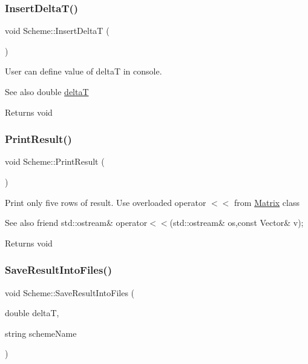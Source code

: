\subsubsection{\texorpdfstring{Insert\+Delta\+T()}{InsertDeltaT()}}
{\footnotesize\ttfamily void Scheme\+::\+Insert\+DeltaT (\begin{DoxyParamCaption}{ }\end{DoxyParamCaption})\hspace{0.3cm}{\ttfamily [protected]}}

User can define value of deltaT in console. \begin{DoxySeeAlso}{See also}
double \mbox{\hyperlink{class_scheme_aaaf978f98d30bd96ea56a9387d1b2c5a}{deltaT}} 
\end{DoxySeeAlso}
\begin{DoxyReturn}{Returns}
void 
\end{DoxyReturn}
\mbox{\label{class_scheme_ae26048cf5128c6ea6e698a7036f2cc42}} 
\subsubsection{\texorpdfstring{Print\+Result()}{PrintResult()}}
{\footnotesize\ttfamily void Scheme\+::\+Print\+Result (\begin{DoxyParamCaption}{ }\end{DoxyParamCaption})}

Print only five rows of result. Use overloaded operator $<$$<$ from \mbox{\hyperlink{class_matrix}{Matrix}} class \begin{DoxySeeAlso}{See also}
friend std\+::ostream\& operator$<$$<$(std\+::ostream\& os,const Vector\& v); 
\end{DoxySeeAlso}
\begin{DoxyReturn}{Returns}
void 
\end{DoxyReturn}
\mbox{\label{class_scheme_ae4512b4c8ead4d8ced95174f0b241f8a}} 
\subsubsection{\texorpdfstring{Save\+Result\+Into\+Files()}{SaveResultIntoFiles()}}
{\footnotesize\ttfamily void Scheme\+::\+Save\+Result\+Into\+Files (\begin{DoxyParamCaption}\item[{double}]{deltaT,  }\item[{string}]{scheme\+Name }\end{DoxyParamCaption})}


